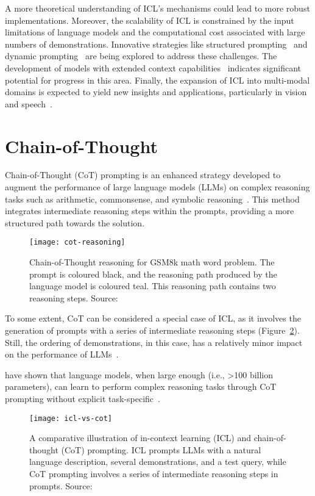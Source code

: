A more theoretical understanding of ICL's mechanisms could lead to more robust implementations.
Moreover, the scalability of ICL is constrained by the input limitations of language models and the computational cost associated with large numbers of demonstrations.
Innovative strategies like structured prompting~\cite{hao2022structured} and dynamic prompting~\cite{wang2023efficient} are being explored to address these challenges.
The development of models with extended context capabilities~\cite{li2023contextual} indicates significant potential for progress in this area.
Finally, the expansion of ICL into multi-modal domains is expected to yield new insights and applications, particularly in vision and speech~\cite{dong2023survey}.


\section{Chain-of-Thought}
\label{sec:chain-of-thought}

Chain-of-Thought (CoT) prompting is an enhanced strategy developed to augment the performance of large language models (LLMs) on complex reasoning tasks such as arithmetic, commonsense, and symbolic reasoning~\cite{wei2022chain, miao2021diverse, talmor2019commonsenseqa}.
This method integrates intermediate reasoning steps within the prompts, providing a more structured path towards the solution.
\begin{figure}[h!]
	\centering
	\texttt{[image: cot-reasoning]}
	\caption{Chain-of-Thought reasoning for GSM8k math word problem. The prompt is coloured black, and the reasoning path produced by the language model is coloured teal. This reasoning path contains two reasoning steps. Source: \textcite{li2022making}}
	\label{fig:cot-reasoning}
\end{figure}
To some extent, CoT can be considered a special case of ICL, as it involves the generation of prompts with a series of intermediate reasoning steps (Figure~\ref{fig:chain-of-thought}). Still, the ordering of demonstrations, in this case, has a relatively minor impact on the performance of LLMs~\cite{wei2022chain}.

\textcite{wei2022chain, wang2022self} have shown that language models, when large enough (i.e., \textgreater 100 billion parameters), can learn to perform complex reasoning tasks through CoT prompting without explicit task-specific~\cite{wei2022emergent}.

\begin{figure}[h!]
	\centering
	\texttt{[image: icl-vs-cot]}
	\caption{A comparative illustration of in-context learning (ICL) and chain-of-thought (CoT) prompting. ICL prompts LLMs with a natural language description, several demonstrations, and a test query, while CoT prompting involves a series of intermediate reasoning steps in prompts. Source: \textcite{survey}}
	\label{fig:chain-of-thought}
\end{figure}

